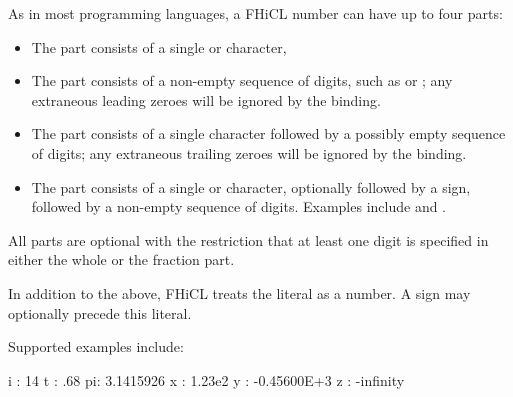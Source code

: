 \documentclass{memarticle}
\newcommand{\fhicl}{FHiCL\xspace}
\begin{document}
As in most programming languages, a \fhicl number can have up to four
parts:
\begin{itemize}
\item The  part consists of a single \fclcode{+} or
  \fclcode{-} character,
\item The  part consists of a non-empty sequence of
  digits, such as  or ; any extraneous leading
  zeroes will be ignored by the binding.
\item The  part consists of a single 
  character followed by a possibly empty sequence of digits; any
  extraneous trailing zeroes will be ignored by the binding.
\item The  part consists of a single  or
   character, optionally followed by a sign, followed by a
  non-empty sequence of digits.  Examples include  and
  .
\end{itemize}
All parts are optional with the restriction that at least one digit is
specified in either the whole or the fraction part.

In addition to the above, \fhicl treats the literal 
as a number.  A sign may optionally precede this literal.
%
%

Supported examples include:

\Needspace{0.67in}
\begin{fcllisting}[texcl,escapechar=`]
i : 14
t : .68
pi: 3.1415926
x : 1.23e2
y : -0.45600E+3
z : -infinity
\end{fcllisting}
\end{document}
